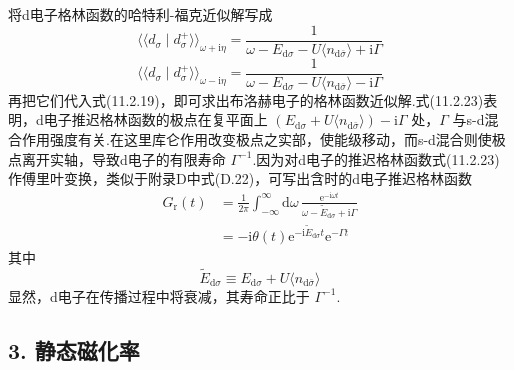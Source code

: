 将d电子格林函数的哈特利-福克近似解写成
\begin{equation}
  \langle\langle d_{\sigma}\mid d^{+}_{\sigma}\rangle\rangle_{\omega+\mathrm{i}\eta}
  =\frac{1}{\omega-E_{\mathrm{d}\sigma}
  -U\langle n_{\mathrm{d}\bar{\sigma}}\rangle+\mathrm{i}\Gamma}
\end{equation}
\begin{equation}
  \langle\langle d_{\sigma}\mid d^{+}_{\sigma}\rangle\rangle_{\omega-\mathrm{i}\eta}
  =\frac{1}{\omega-E_{\mathrm{d}\sigma}
  -U\langle n_{\mathrm{d}\bar{\sigma}}\rangle-\mathrm{i}\Gamma}
\end{equation}
再把它们代入式(11.2.19)，即可求出布洛赫电子的格林函数近似解.式(11.2.23)表明，d电子推迟格林函数的极点在复平面上 $(E_{\mathrm{d}\sigma}+U\langle n_{\mathrm{d}\bar{\sigma}}\rangle)-\mathrm{i}\Gamma$ 处，$\Gamma$ 与s-d混合作用强度有关.在这里库仑作用改变极点之实部，使能级移动，而s-d混合则使极点离开实轴，导致d电子的有限寿命 $\Gamma^{-1}$.因为对d电子的推迟格林函数式(11.2.23)作傅里叶变换，类似于附录D中式(D.22)，可写出含时的d电子推迟格林函数
\begin{equation*}
\begin{aligned}
  G_{\mathrm{r}}(t)&=\frac{1}{2\pi}\int_{-\infty}^{\infty}\mathrm{d}\omega\,
  \frac{\mathrm{e}^{-\mathrm{i}\omega t}}{\omega-\tilde{E}_{\mathrm{d}\sigma}+\mathrm{i}\Gamma}\\
  &=-\mathrm{i}\theta(t)\mathrm{e}^{-\mathrm{i}\tilde{E}_{\mathrm{d}\sigma}t}
  \mathrm{e}^{-\Gamma t}
\end{aligned}
\end{equation*}
其中
\begin{equation*}
  \tilde{E}_{\mathrm{d}\sigma}\equiv E_{\mathrm{d}\sigma}
  +U\langle n_{\mathrm{d}\bar{\sigma}}\rangle
\end{equation*}
显然，d电子在传播过程中将衰减，其寿命正比于 $\Gamma^{-1}$.

\subsection*{3. 静态磁化率}

